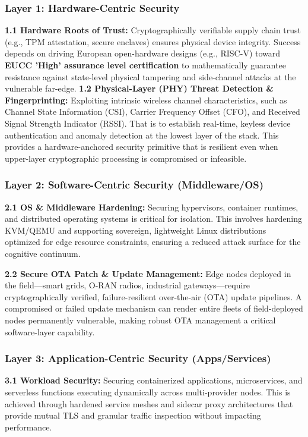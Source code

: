 \documentclass[12pt,a4paper]{article}
\begin{document}
\subsubsection*{Layer 1: Hardware-Centric Security}
\textbf{1.1 Hardware Roots of Trust:} Cryptographically verifiable supply chain trust (e.g., TPM attestation, secure enclaves) ensures physical device integrity. Success depends on driving European open-hardware designs (e.g., RISC-V) toward \textbf{EUCC 'High' assurance level certification} \cite{eucc} to mathematically guarantee resistance against state-level physical tampering and side-channel attacks at the vulnerable far-edge.
\textbf{1.2 Physical-Layer (PHY) Threat Detection \& Fingerprinting:} Exploiting intrinsic wireless channel characteristics, such as Channel State Information (CSI), Carrier Frequency Offset (CFO), and Received Signal Strength Indicator (RSSI). That is to establish real-time, keyless device authentication and anomaly detection at the lowest layer of the stack. This provides a hardware-anchored security primitive that is resilient even when upper-layer cryptographic processing is compromised or infeasible.

\subsubsection*{Layer 2: Software-Centric Security (Middleware/OS)}

\textbf{2.1 OS \& Middleware Hardening:} Securing hypervisors, container runtimes, and distributed operating systems is critical for isolation. This involves hardening KVM/QEMU and supporting sovereign, lightweight Linux distributions optimized for edge resource constraints, ensuring a reduced attack surface for the cognitive continuum.

\textbf{2.2 Secure OTA Patch \& Update Management:} Edge nodes deployed in the field---smart grids, O-RAN radios, industrial gateways---require cryptographically verified, failure-resilient over-the-air (OTA) update pipelines. A compromised or failed update mechanism can render entire fleets of field-deployed nodes permanently vulnerable, making robust OTA management a critical software-layer capability.

\subsubsection*{Layer 3: Application-Centric Security (Apps/Services)}

\textbf{3.1 Workload Security:} Securing containerized applications, microservices, and serverless functions executing dynamically across multi-provider nodes. This is achieved through hardened service meshes and sidecar proxy architectures that provide mutual TLS and granular traffic inspection without impacting performance.
\end{document}
